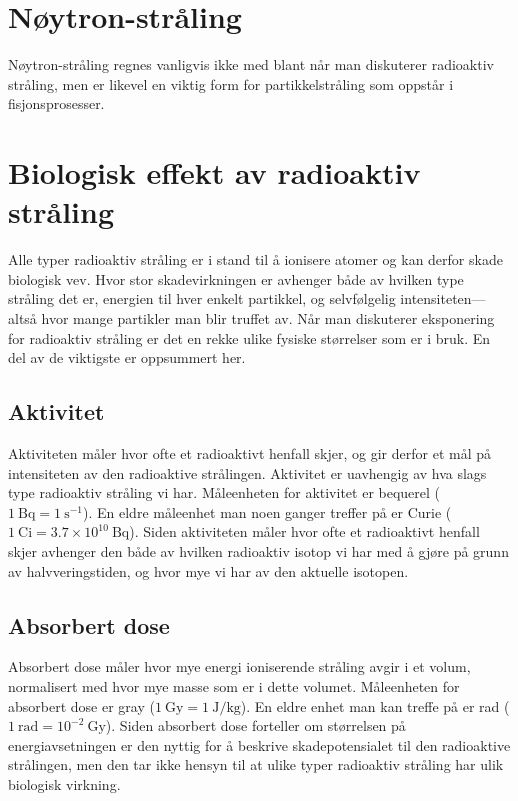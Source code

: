 \section{Nøytron-stråling}
Nøytron-stråling regnes vanligvis ikke med blant når man diskuterer radioaktiv stråling, men er likevel en viktig form for partikkelstråling som oppstår i fisjonsprosesser. 

\section{Biologisk effekt av radioaktiv stråling}
Alle typer radioaktiv stråling er i stand til å ionisere atomer og kan derfor skade biologisk vev. Hvor stor skadevirkningen er avhenger både av hvilken type stråling det er, energien til hver enkelt partikkel, og selvfølgelig intensiteten---altså hvor mange partikler man blir truffet av. Når man diskuterer eksponering for radioaktiv stråling er det en rekke ulike fysiske størrelser som er i bruk. En del av de viktigste er oppsummert her.

\subsection{Aktivitet}
Aktiviteten måler hvor ofte et radioaktivt henfall skjer, og gir derfor et mål på intensiteten av den radioaktive strålingen. Aktivitet er uavhengig av hva slags type radioaktiv stråling vi har. Måleenheten for aktivitet er bequerel ($1~\mathrm{Bq} = 1~\mathrm{s^{-1}}$). En eldre måleenhet man noen ganger treffer på er Curie ($1~\mathrm{Ci} = 3.7\times10^{10}~\mathrm{Bq}$). Siden aktiviteten måler hvor ofte et radioaktivt henfall skjer avhenger den både av hvilken radioaktiv isotop vi har med å gjøre på grunn av halvveringstiden, og hvor mye vi har av den aktuelle isotopen. 

\subsection{Absorbert dose}
Absorbert dose måler hvor mye energi ioniserende stråling avgir i et volum, normalisert med hvor mye masse som er i dette volumet. Måleenheten for absorbert dose er gray ($1~\mathrm{Gy}= 1~\mathrm{J/kg}$). En eldre enhet man kan treffe på er rad ($1~\mathrm{rad} = 10^{-2}~\mathrm{Gy}$). Siden absorbert dose forteller om størrelsen på energiavsetningen er den nyttig for å beskrive skadepotensialet til den radioaktive strålingen, men den tar ikke hensyn til at ulike typer radioaktiv stråling har ulik biologisk virkning.


